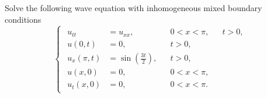 \documentclass[plain]{pset}
\begin{document}
\pagebreak

\begin{problem}
Solve the following wave equation with inhomogeneous mixed boundary conditions
\[
    \begin{cases}
        \begin{aligned}
            u_{tt}      & = u_{xx},                        &  & 0 < x < \pi, &  & t > 0, \\
            u(0, t)     & = 0,                             &  & t > 0,                   \\
            u_x(\pi, t) & = \sin\left(\frac{3t}{2}\right), &  & t > 0,                   \\
            u(x, 0)     & = 0,                             &  & 0 < x < \pi,             \\
            u_t(x, 0)   & = 0,                             &  & 0 < x < \pi.
        \end{aligned}
    \end{cases}
\]
\end{problem}
\begin{solution}

\end{solution}
\end{document}
